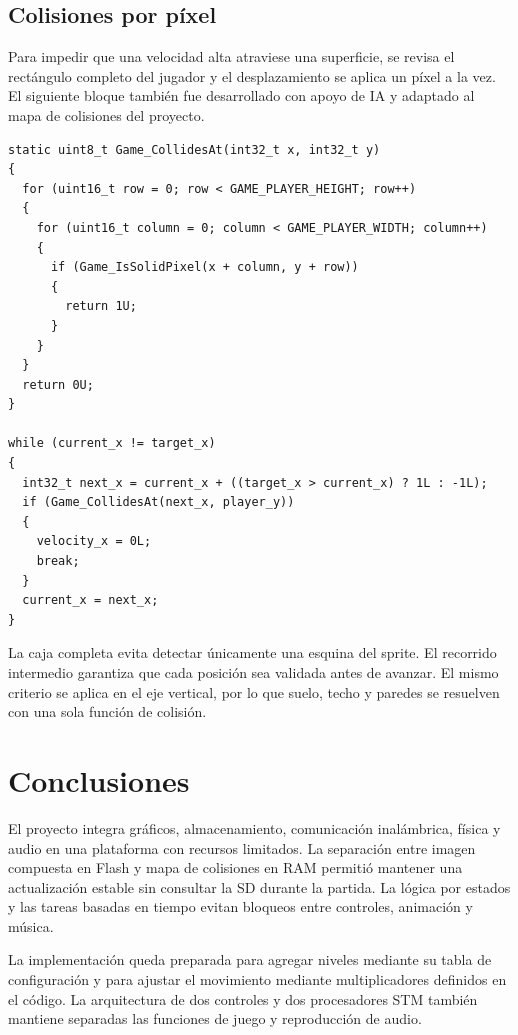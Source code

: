 \documentclass[11pt,letterpaper]{article}
\begin{document}
\subsection{Colisiones por píxel}

Para impedir que una velocidad alta atraviese una superficie, se revisa el
rectángulo completo del jugador y el desplazamiento se aplica un píxel a la vez. El
siguiente bloque también fue desarrollado con apoyo de IA y adaptado al mapa de
colisiones del proyecto.

\begin{lstlisting}[caption={Comprobación de la caja completa del jugador.}]
static uint8_t Game_CollidesAt(int32_t x, int32_t y)
{
  for (uint16_t row = 0; row < GAME_PLAYER_HEIGHT; row++)
  {
    for (uint16_t column = 0; column < GAME_PLAYER_WIDTH; column++)
    {
      if (Game_IsSolidPixel(x + column, y + row))
      {
        return 1U;
      }
    }
  }
  return 0U;
}

while (current_x != target_x)
{
  int32_t next_x = current_x + ((target_x > current_x) ? 1L : -1L);
  if (Game_CollidesAt(next_x, player_y))
  {
    velocity_x = 0L;
    break;
  }
  current_x = next_x;
}
\end{lstlisting}

La caja completa evita detectar únicamente una esquina del sprite. El recorrido
intermedio garantiza que cada posición sea validada antes de avanzar. El mismo
criterio se aplica en el eje vertical, por lo que suelo, techo y paredes se resuelven
con una sola función de colisión.

\section{Conclusiones}

El proyecto integra gráficos, almacenamiento, comunicación inalámbrica, física y
audio en una plataforma con recursos limitados. La separación entre imagen compuesta
en Flash y mapa de colisiones en RAM permitió mantener una actualización estable sin
consultar la SD durante la partida. La lógica por estados y las tareas basadas en
tiempo evitan bloqueos entre controles, animación y música.

La implementación queda preparada para agregar niveles mediante su tabla de
configuración y para ajustar el movimiento mediante multiplicadores definidos en el
código. La arquitectura de dos controles y dos procesadores STM también mantiene
separadas las funciones de juego y reproducción de audio.
\end{document}
